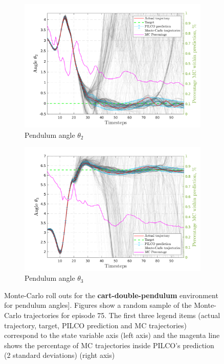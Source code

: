 \begin{figure}[htp!]    
    \begin{subfigure}[b]{1\linewidth}
    \centering
    \includegraphics[height=0.4\textheight,width=1\textwidth]{Chapter3/Figures/cdp_MC_rollout_Ep_75_Dim_5.png} 
    \caption{Pendulum angle $\theta_2$} 
    \label{Fig:Re-cdp-angle2} 
  \end{subfigure}
  \hspace{\fill}
  \begin{subfigure}[b]{1\linewidth}
    \centering
    \includegraphics[height=0.4\textheight,width=1\textwidth]{Chapter3/Figures/cdp_MC_rollout_Ep_75_Dim_6.png} 
    \caption{Pendulum angle $\theta_3$} 
    \label{Fig:Re-cdp-angle3} 
  \end{subfigure} 
\caption[Monte-Carlo roll outs for \textbf{cart-double-pendulum} pendulum angles]{Monte-Carlo roll outs for the \textbf{cart-double-pendulum} environment for  pendulum angles]. Figures show a random sample of the Monte-Carlo trajectories for episode 75. The first three legend items (actual trajectory, target, PILCO prediction and MC trajectories) correspond to the state variable axis (left axis) and the magenta line shows the percentage of MC trajectories inside PILCO's prediction (2 standard deviations) (right axis)}
\label{Re:cdp-MC-roll-outs-3} 
\end{figure} 
 
